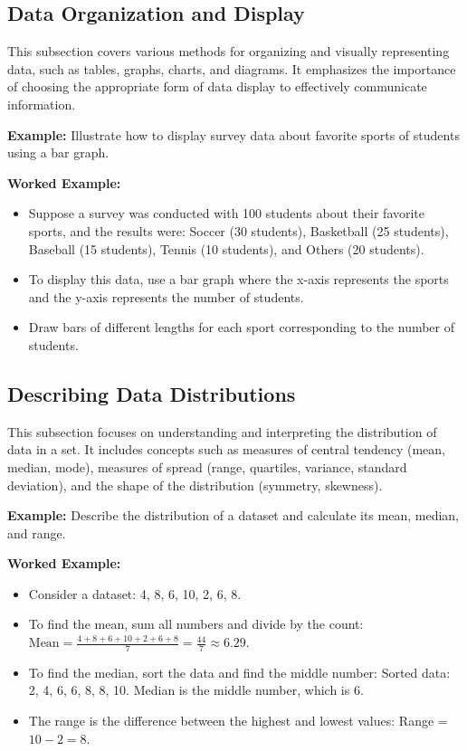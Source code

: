 \documentclass{book}
\begin{document}
\subsection{Data Organization and Display}
This subsection covers various methods for organizing and visually representing data, such as tables, graphs, charts, and diagrams. It emphasizes the importance of choosing the appropriate form of data display to effectively communicate information.


\textbf{Example:} Illustrate how to display survey data about favorite sports of students using a bar graph.


\textbf{Worked Example:}
\begin{itemize}
        \item Suppose a survey was conducted with 100 students about their favorite sports, and the results were: Soccer (30 students), Basketball (25 students), Baseball (15 students), Tennis (10 students), and Others (20 students).
        \item To display this data, use a bar graph where the x-axis represents the sports and the y-axis represents the number of students.
        \item Draw bars of different lengths for each sport corresponding to the number of students.
\end{itemize}


\subsection{Describing Data Distributions}
This subsection focuses on understanding and interpreting the distribution of data in a set. It includes concepts such as measures of central tendency (mean, median, mode), measures of spread (range, quartiles, variance, standard deviation), and the shape of the distribution (symmetry, skewness).


\textbf{Example:} Describe the distribution of a dataset and calculate its mean, median, and range.


\textbf{Worked Example:}
\begin{itemize}
        \item Consider a dataset: 4, 8, 6, 10, 2, 6, 8.
        \item To find the mean, sum all numbers and divide by the count: \( \text{Mean} = \frac{4 + 8 + 6 + 10 + 2 + 6 + 8}{7} = \frac{44}{7} \approx 6.29 \).
        \item To find the median, sort the data and find the middle number: Sorted data: 2, 4, 6, 6, 8, 8, 10. Median is the middle number, which is 6.
        \item The range is the difference between the highest and lowest values: Range = \(10 - 2 = 8\).
\end{itemize}
\end{document}

